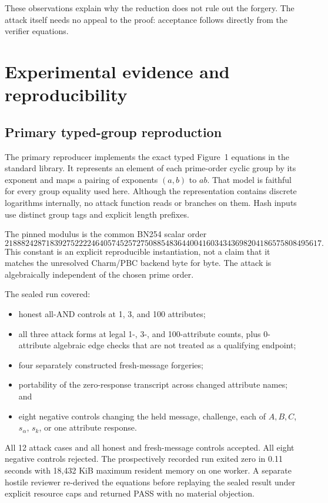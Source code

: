 \documentclass[10pt,a4paper]{article}
\begin{document}
These observations explain why the reduction does not rule out the forgery.
The attack itself needs no appeal to the proof: acceptance follows directly
from the verifier equations.

\section{Experimental evidence and reproducibility}

\subsection{Primary typed-group reproduction}

The primary reproducer implements the exact typed Figure~1 equations in the
standard library. It represents an element of each prime-order cyclic group by
its exponent and maps a pairing of exponents $(a,b)$ to $ab$. That model is
faithful for every group equality used here. Although the representation
contains discrete logarithms internally, no attack function reads or branches
on them. Hash inputs use distinct group tags and explicit length prefixes.

The pinned modulus is the common BN254 scalar order
\[
21888242871839275222246405745257275088548364400416034343698204186575808495617.
\]
This constant is an explicit reproducible instantiation, not a claim that it
matches the unresolved Charm/PBC backend byte for byte. The attack is
algebraically independent of the chosen prime order.

The sealed run covered:
\begin{itemize}
  \item honest all-AND controls at 1, 3, and 100 attributes;
  \item all three attack forms at legal 1-, 3-, and 100-attribute counts,
        plus 0-attribute algebraic edge checks that are not treated as a
        qualifying endpoint;
  \item four separately constructed fresh-message forgeries;
  \item portability of the zero-response transcript across changed attribute
        names; and
  \item eight negative controls changing the held message, challenge, each of
        $A,B,C$, $s_\alpha$, $s_k$, or one attribute response.
\end{itemize}
All 12 attack cases and all honest and fresh-message controls accepted. All
eight negative controls rejected. The prospectively recorded run exited zero
in 0.11 seconds with 18,432 KiB maximum resident memory on one worker. A
separate hostile reviewer re-derived the equations before replaying the
sealed result under explicit resource caps and returned PASS with no material
objection.
\end{document}
